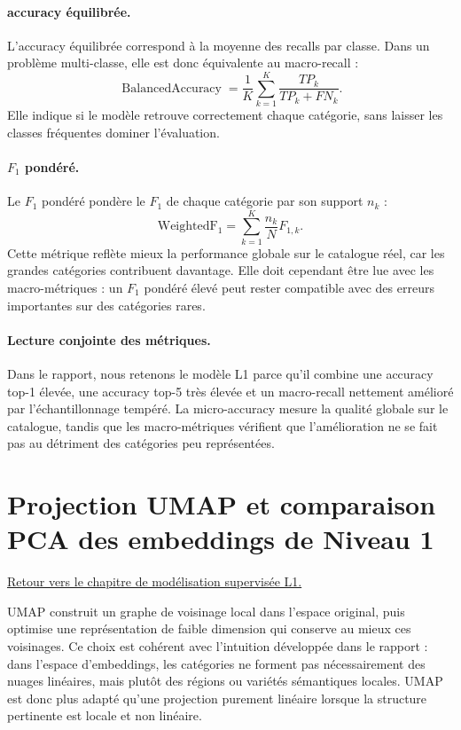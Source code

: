 \documentclass[12pt,a4paper]{report}
\begin{document}
\paragraph{accuracy équilibrée.}
L'accuracy équilibrée correspond à la moyenne des recalls par classe. Dans un problème multi-classe, elle est donc équivalente au macro-recall :
\begin{equation}
    \operatorname{BalancedAccuracy}
    =
    \frac{1}{K}\sum_{k=1}^{K}
    \frac{TP_k}{TP_k+FN_k}.
\end{equation}
Elle indique si le modèle retrouve correctement chaque catégorie, sans laisser les classes fréquentes dominer l'évaluation.

\paragraph{$F_1$ pondéré.}
Le $F_1$ pondéré pondère le $F_1$ de chaque catégorie par son support $n_k$ :
\begin{equation}
    \operatorname{WeightedF_1}
    =
    \sum_{k=1}^{K}
    \frac{n_k}{N}
    F_{1,k}.
\end{equation}
Cette métrique reflète mieux la performance globale sur le catalogue réel, car les grandes catégories contribuent davantage. Elle doit cependant être lue avec les macro-métriques : un $F_1$ pondéré élevé peut rester compatible avec des erreurs importantes sur des catégories rares.

\paragraph{Lecture conjointe des métriques.}
Dans le rapport, nous retenons le modèle L1 parce qu'il combine une accuracy top-1 élevée, une accuracy top-5 très élevée et un macro-recall nettement amélioré par l'échantillonnage tempéré. La micro-accuracy mesure la qualité globale sur le catalogue, tandis que les macro-métriques vérifient que l'amélioration ne se fait pas au détriment des catégories peu représentées.

\section*{Projection UMAP et comparaison PCA des embeddings de Niveau 1}
\label{sec:umap-pca-annex}

\noindent\hyperref[chap:l1-supervised]{Retour vers le chapitre de modélisation supervisée L1.}

UMAP construit un graphe de voisinage local dans l'espace original, puis optimise une représentation de faible dimension qui conserve au mieux ces voisinages. Ce choix est cohérent avec l'intuition développée dans le rapport : dans l'espace d'embeddings, les catégories ne forment pas nécessairement des nuages linéaires, mais plutôt des régions ou variétés sémantiques locales. UMAP est donc plus adapté qu'une projection purement linéaire lorsque la structure pertinente est locale et non linéaire.
\end{document}
